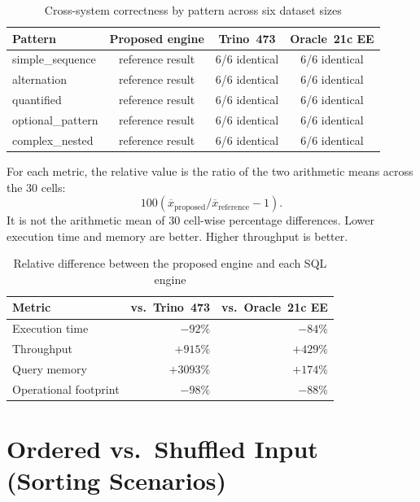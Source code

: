 \begin{table}[H]
\centering
\caption{Cross-system correctness by pattern across six dataset sizes}
\label{tab:cross_system_correctness}
\begin{tabular}{>{\ttfamily}lccc}
\toprule
\textbf{Pattern} & \textbf{Proposed engine} & \textbf{Trino~473} & \textbf{Oracle~21c EE} \\
\midrule
simple\_sequence & reference result & 6/6 identical & 6/6 identical \\
alternation & reference result & 6/6 identical & 6/6 identical \\
quantified & reference result & 6/6 identical & 6/6 identical \\
optional\_pattern & reference result & 6/6 identical & 6/6 identical \\
complex\_nested & reference result & 6/6 identical & 6/6 identical \\
\bottomrule
\end{tabular}
\end{table}

For each metric, the relative value is the ratio of the two
arithmetic means across the 30 cells:
\[
100\left(\overline{x}_{\mathrm{proposed}}
/\overline{x}_{\mathrm{reference}}-1\right).
\]
It is not the arithmetic mean of 30 cell-wise percentage differences.
Lower execution time and memory are better.  Higher throughput is
better.

\begin{table}[H]
\centering
\caption{Relative difference between the proposed engine and each SQL engine}
\label{tab:relative_comparison}
\begin{tabular}{lrr}
\toprule
\textbf{Metric} & \textbf{vs.\ Trino~473} & \textbf{vs.\ Oracle~21c EE} \\
\midrule
Execution time & $-92\%$ & $-84\%$ \\
Throughput & $+915\%$ & $+429\%$ \\
Query memory & $+3093\%$ & $+174\%$ \\
Operational footprint & $-98\%$ & $-88\%$ \\
\bottomrule
\end{tabular}
\end{table}


\section{Ordered vs.\ Shuffled Input (Sorting Scenarios)}
\label{app:sorting-scenarios}

